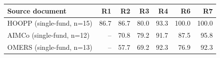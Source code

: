 \begin{tabular}{lrrrrrr}
\toprule
Source document & R1 & R2 & R3 & R4 & R6 & R7 \\
\midrule
HOOPP (single-fund, n=15) & 86.7 & 86.7 & 80.0 & 93.3 & 100.0 & 100.0 \\
AIMCo (single-fund, n=12) & -- & 70.8 & 79.2 & 91.7 & 87.5 & 95.8 \\
OMERS (single-fund, n=13) & -- & 57.7 & 69.2 & 92.3 & 76.9 & 92.3 \\
\bottomrule
\end{tabular}
